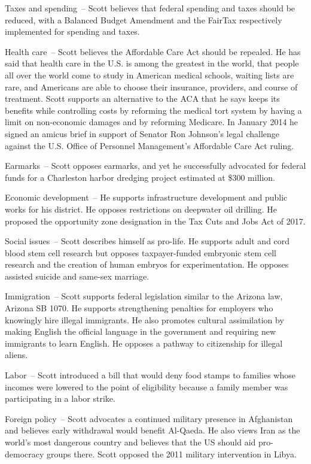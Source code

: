 Taxes and spending~-- Scott believes that federal spending and taxes
should be reduced, with a Balanced Budget Amendment and the FairTax
respectively implemented for spending and taxes.

Health care~-- Scott believes the Affordable Care Act should be
repealed. He has said that health care in the U.S. is among the greatest
in the world, that people all over the world come to study in American
medical schools, waiting lists are rare, and Americans are able to
choose their insurance, providers, and course of treatment. Scott
supports an alternative to the ACA that he says keeps its benefits while
controlling costs by reforming the medical tort system by having a limit
on non-economic damages and by reforming Medicare. In January 2014 he
signed an amicus brief in support of Senator Ron Johnson's legal
challenge against the U.S. Office of Personnel Management's Affordable
Care Act ruling.

Earmarks~-- Scott opposes earmarks, and yet he successfully advocated
for federal funds for a Charleston harbor dredging project estimated at
\$300 million.

Economic development~-- He supports infrastructure development and
public works for his district. He opposes restrictions on deepwater oil
drilling. He proposed the opportunity zone designation in the Tax Cuts
and Jobs Act of 2017.

Social issues~-- Scott describes himself as pro-life. He supports adult
and cord blood stem cell research but opposes taxpayer-funded embryonic
stem cell research and the creation of human embryos for
experimentation. He opposes assisted suicide and same-sex marriage.

Immigration~-- Scott supports federal legislation similar to the Arizona
law, Arizona SB 1070. He supports strengthening penalties for employers
who knowingly hire illegal immigrants. He also promotes cultural
assimilation by making English the official language in the government
and requiring new immigrants to learn English. He opposes a pathway to
citizenship for illegal aliens.

Labor~-- Scott introduced a bill that would deny food stamps to families
whose incomes were lowered to the point of eligibility because a family
member was participating in a labor strike.

Foreign policy~-- Scott advocates a continued military presence in
Afghanistan and believes early withdrawal would benefit Al-Qaeda. He
also views Iran as the world's most dangerous country and believes that
the US should aid pro-democracy groups there. Scott opposed the 2011
military intervention in Libya.

